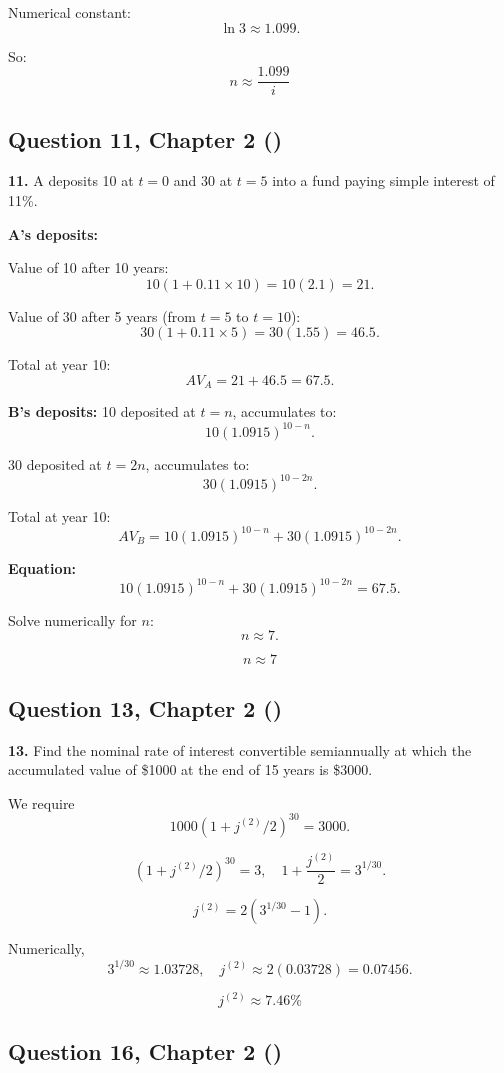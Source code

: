 \documentclass[12pt, a4paper]{article}
\begin{document}
Numerical constant:
\[
\ln 3 \approx 1.099.
\]

So:
\[
\boxed{n \approx \frac{1.099}{i}}
\]

\subsection*{Question 11, Chapter 2 (\cite{toi3rd})}

\textbf{11.}  
A deposits 10 at \(t=0\) and 30 at \(t=5\) into a fund paying simple interest of 11\%.  

\bigskip
\textbf{A’s deposits:}

Value of 10 after 10 years:
\[
10 \left(1 + 0.11 \times 10\right) = 10(2.1) = 21.
\]

Value of 30 after 5 years (from \(t=5\) to \(t=10\)):
\[
30 \left(1 + 0.11 \times 5\right) = 30(1.55) = 46.5.
\]

Total at year 10:
\[
AV_A = 21 + 46.5 = 67.5.
\]

\bigskip
\textbf{B’s deposits:}  
10 deposited at \(t=n\), accumulates to:
\[
10(1.0915)^{10-n}.
\]

30 deposited at \(t=2n\), accumulates to:
\[
30(1.0915)^{10-2n}.
\]

Total at year 10:
\[
AV_B = 10(1.0915)^{10-n} + 30(1.0915)^{10-2n}.
\]

\bigskip
\textbf{Equation:}
\[
10(1.0915)^{10-n} + 30(1.0915)^{10-2n} = 67.5.
\]

Solve numerically for \(n\):
\[
n \approx 7.
\]

\[
\boxed{n \approx 7}
\]

\subsection*{Question 13, Chapter 2 (\cite{toi3rd})}

\textbf{13.} Find the nominal rate of interest convertible semiannually at which 
the accumulated value of \$1000 at the end of 15 years is \$3000.

\bigskip
We require
\[
1000(1+j^{(2)}/2)^{30} = 3000.
\]

\[
(1+j^{(2)}/2)^{30} = 3,
\quad 1+\frac{j^{(2)}}{2} = 3^{1/30}.
\]

\[
j^{(2)} = 2\left(3^{1/30} - 1\right).
\]

Numerically,
\[
3^{1/30} \approx 1.03728,
\quad j^{(2)} \approx 2(0.03728) = 0.07456.
\]

\[
\boxed{j^{(2)} \approx 7.46\%}
\]

\subsection*{Question 16, Chapter 2 (\cite{toi3rd})}
\end{document}
